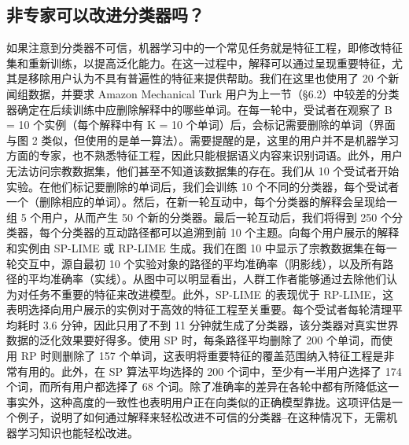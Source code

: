 \documentclass[12pt, a4paper]{ctexart} %
\begin{document}
\subsection{非专家可以改进分类器吗？}
如果注意到分类器不可信，机器学习中的一个常见任务就是特征工程，即修改特征集和重新训练，以提高泛化能力。在这一过程中，解释可以通过呈现重要特征，尤其是移除用户认为不具有普遍性的特征来提供帮助。我们在这里也使用了 20 个新闻组数据，并要求 Amazon Mechanical Turk 用户为上一节（§6.2）中较差的分类器确定在后续训练中应删除解释中的哪些单词。在每一轮中，受试者在观察了 B = 10 个实例（每个解释中有 K = 10 个单词）后，会标记需要删除的单词（界面与图 2 类似，但使用的是单一算法）。需要提醒的是，这里的用户并不是机器学习方面的专家，也不熟悉特征工程，因此只能根据语义内容来识别词语。此外，用户无法访问宗教数据集，他们甚至不知道该数据集的存在。我们从 10 个受试者开始实验。在他们标记要删除的单词后，我们会训练 10 个不同的分类器，每个受试者一个（删除相应的单词）。然后，在新一轮互动中，每个分类器的解释会呈现给一组 5 个用户，从而产生 50 个新的分类器。最后一轮互动后，我们将得到 250 个分类器，每个分类器的互动路径都可以追溯到前 10 个主题。向每个用户展示的解释和实例由 SP-LIME 或 RP-LIME 生成。我们在图 10 中显示了宗教数据集在每一轮交互中，源自最初 10 个实验对象的路径的平均准确率（阴影线），以及所有路径的平均准确率（实线）。从图中可以明显看出，人群工作者能够通过去除他们认为对任务不重要的特征来改进模型。此外，SP-LIME 的表现优于 RP-LIME，这表明选择向用户展示的实例对于高效的特征工程至关重要。每个受试者每轮清理平均耗时 3.6 分钟，因此只用了不到 11 分钟就生成了分类器，该分类器对真实世界数据的泛化效果要好得多。使用 SP 时，每条路径平均删除了 200 个单词，而使用 RP 时则删除了 157 个单词，这表明将重要特征的覆盖范围纳入特征工程是非常有用的。此外，在 SP 算法平均选择的 200 个词中，至少有一半用户选择了 174 个词，而所有用户都选择了 68 个词。除了准确率的差异在各轮中都有所降低这一事实外，这种高度的一致性也表明用户正在向类似的正确模型靠拢。这项评估是一个例子，说明了如何通过解释来轻松改进不可信的分类器--在这种情况下，无需机器学习知识也能轻松改进。
\end{document}
